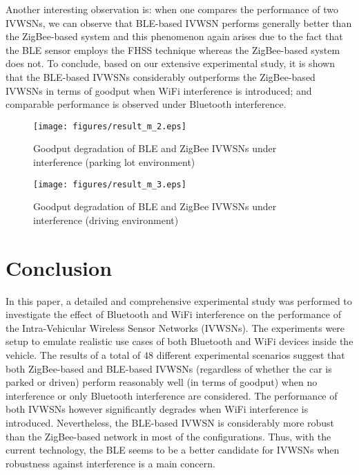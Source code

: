\documentclass[journal]{IEEEtran}
\begin{document}
Another interesting observation is: when one compares the performance of two IVWSNs, we can observe that BLE-based IVWSN performs generally better than the ZigBee-based system and this phenomenon again arises due to the fact that the BLE sensor employs the FHSS technique whereas the ZigBee-based system does not. To conclude, based on our extensive experimental study, it is shown that the BLE-based IVWSNs considerably outperforms the ZigBee-based IVWSNs in terms of goodput when WiFi interference is introduced; and comparable performance is observed under Bluetooth interference.


\begin{figure}[tbp]
\centering
\texttt{[image: figures/result\_m\_2.eps]}
\caption{Goodput degradation of BLE and ZigBee IVWSNs under interference (parking lot environment)}
\label{result_2}
\end{figure}

\begin{figure}[tbp]
\centering
\texttt{[image: figures/result\_m\_3.eps]}
\caption{Goodput degradation of BLE and ZigBee IVWSNs under interference (driving environment)}
\label{result_3}
\end{figure}




























\section{Conclusion}


In this paper, a detailed and comprehensive experimental study was performed to investigate the effect of Bluetooth and WiFi interference on the performance of the Intra-Vehicular Wireless Sensor Networks (IVWSNs). The experiments were setup to emulate realistic use cases of both Bluetooth and WiFi devices inside the vehicle. The results of a total of 48 different experimental scenarios suggest that both ZigBee-based and BLE-based IVWSNs (regardless of whether the car is parked or driven) perform reasonably well (in terms of goodput) when no interference or only Bluetooth interference are considered. The performance of both IVWSNs however significantly degrades when WiFi interference is introduced. Nevertheless, the BLE-based IVWSN is considerably more robust than the ZigBee-based network in most of the configurations. Thus, with the current technology, the BLE seems to be a better candidate for IVWSNs when robustness against interference is a main concern. 





\ifCLASSOPTIONcaptionsoff
  \newpage
\fi

\linespread{0.85}


\end{document}
